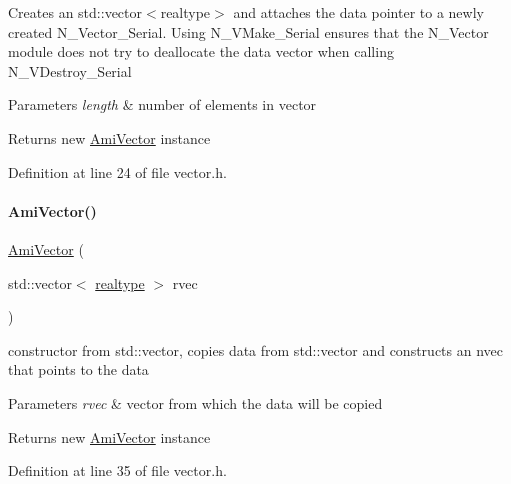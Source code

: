 Creates an std\+::vector$<$realtype$>$ and attaches the data pointer to a newly created N\+\_\+\+Vector\+\_\+\+Serial. Using N\+\_\+\+V\+Make\+\_\+\+Serial ensures that the N\+\_\+\+Vector module does not try to deallocate the data vector when calling N\+\_\+\+V\+Destroy\+\_\+\+Serial 
\begin{DoxyParams}{Parameters}
{\em length} & number of elements in vector \\
\hline
\end{DoxyParams}
\begin{DoxyReturn}{Returns}
new \mbox{\hyperlink{classamici_1_1_ami_vector}{Ami\+Vector}} instance 
\end{DoxyReturn}


Definition at line 24 of file vector.\+h.

\mbox{\label{classamici_1_1_ami_vector_a8ef9433b11b0d14c32e2e4ce18fe055e}} 
\paragraph{\texorpdfstring{AmiVector()}{AmiVector()}\hspace{0.1cm}{\footnotesize\ttfamily [2/3]}}
{\footnotesize\ttfamily \mbox{\hyperlink{classamici_1_1_ami_vector}{Ami\+Vector}} (\begin{DoxyParamCaption}\item[{std\+::vector$<$ \mbox{\hyperlink{namespaceamici_a1bdce28051d6a53868f7ccbf5f2c14a3}{realtype}} $>$}]{rvec }\end{DoxyParamCaption})\hspace{0.3cm}{\ttfamily [explicit]}}

constructor from std\+::vector, copies data from std\+::vector and constructs an nvec that points to the data 
\begin{DoxyParams}{Parameters}
{\em rvec} & vector from which the data will be copied \\
\hline
\end{DoxyParams}
\begin{DoxyReturn}{Returns}
new \mbox{\hyperlink{classamici_1_1_ami_vector}{Ami\+Vector}} instance 
\end{DoxyReturn}


Definition at line 35 of file vector.\+h.

\mbox{\label{classamici_1_1_ami_vector_a3202c4cf34466ec28baece9cf1eae880}} 
